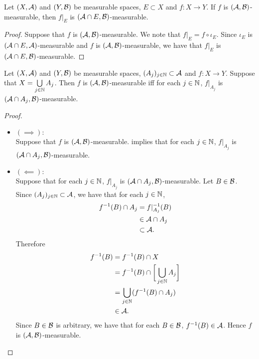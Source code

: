 \documentclass{book}
\begin{document}
	\begin{ex} 
		Let $(X, \mathcal{A})$ and $(Y, \mathcal{B})$ be measurable spaces, $E \subset X$ and $f:X \rightarrow Y$. If $f$ is $(\mathcal{A}, \mathcal{B})$-measurable, then $f|_E$ is $(\mathcal{A} \cap E, \mathcal{B})$-measurable. 
	\end{ex}

	\begin{proof}
		Suppose that $f$ is $(\mathcal{A}, \mathcal{B})$-measurable. We note that $f|_E = f \circ \iota_E$. Since $\iota_E$ is $(\mathcal{A} \cap E, \mathcal{A})$-measurable and $f$ is $(\mathcal{A}, \mathcal{B})$-measurable, we have that $f|_E$ is $(\mathcal{A} \cap E, \mathcal{B})$-measurable. 
	\end{proof}

	\begin{ex} 
		Let $(X, \mathcal{A})$ and $(Y, \mathcal{B})$ be measurable spaces, $(A_j)_{j \in \mathbb{N}} \subset \mathcal{A}$ and $f:X \rightarrow Y$. Suppose that $X = \bigcup\limits_{j \in \mathbb{N}} A_j$. Then $f$ is $(\mathcal{A}, \mathcal{B})$-measurable iff for each $j \in \mathbb{N}$, $f|_{A_j}$ is $(\mathcal{A} \cap A_j, \mathcal{B})$-measurable.
	\end{ex}

	\begin{proof}\
		\begin{itemize}
			\item $(\implies):$ \\
			Suppose that $f$ is $(\mathcal{A}, \mathcal{B})$-measurable.  implies that for each $j \in \mathbb{N}$, $f|_{A_j}$ is $(\mathcal{A} \cap A_j, \mathcal{B})$-measurable.
			\item $(\impliedby):$ \\
			Suppose that for each $j \in \mathbb{N}$, $f|_{A_j}$ is $(\mathcal{A} \cap A_j, \mathcal{B})$-measurable. Let $B \in \mathcal{B}$. Since $(A_j)_{j \in \mathbb{N}} \subset \mathcal{A}$, we have that for each $j \in \mathbb{N}$, 
			\begin{align*}
				f^{-1}(B) \cap A_j
				& = f|_{A_j}^{-1}(B) \\
				& \in \mathcal{A} \cap A_j \\
				& \subset \mathcal{A}.
			\end{align*}
			Therefore
			\begin{align*}
				f^{-1}(B)
				& = f^{-1}(B) \cap X \\
				& = f^{-1}(B) \cap \bigg[ \bigcup\limits_{j \in \mathbb{N}} A_j \bigg] \\
				& = \bigcup\limits_{j \in \mathbb{N}} (f^{-1}(B) \cap A_j) \\
				& \in \mathcal{A}. 
			\end{align*}
			Since $B \in \mathcal{B}$ is arbitrary, we have that for each $B \in \mathcal{B}$, $f^{-1}(B) \in \mathcal{A}$. Hence $f$ is $(\mathcal{A}, \mathcal{B})$-measurable.
		\end{itemize}
	\end{proof}
\end{document}
